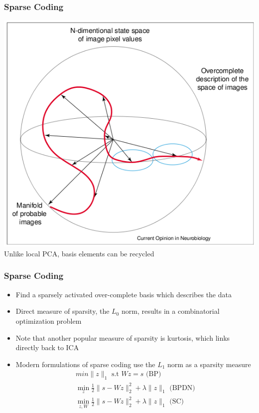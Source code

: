 \documentclass{beamer}
\begin{document}
\begin{frame} 
\begin{center}
\frametitle{Sparse Coding} 
\includegraphics[scale = 0.4]{imageManifold.png} \\
Unlike local PCA, basis elements can be recycled 
\end{center} 
\end{frame} 


\begin{frame}
\frametitle{Sparse Coding}  
\begin{itemize}
\item{Find a sparsely activated over-complete basis which describes the data} 
\item{Direct measure of sparsity, the $L_0$ norm, results in a combinatorial optimization problem} 
\item{Note that another popular measure of sparsity is kurtosis, which links directly back to ICA} 
\item{Modern formulations of sparse coding use the $L_1$ norm as a sparsity measure} 
\begin{eqnarray}
\nonumber
min \| z \| _1 \mbox{ s.t } W z = s \mbox{ (BP)} \\
\nonumber
\min_{z} \frac{1}{2} \|s - W z \|_2 ^2 + \lambda \| z \|_1 \mbox{ (BPDN)} \\ 
\nonumber 
\min_{z, W} \frac{1}{2} \|s - W z \|_2 ^2 + \lambda \| z \|_1 \mbox{ (SC)}
\end{eqnarray} 
\end{itemize} 
\end{frame} 
\end{document}
